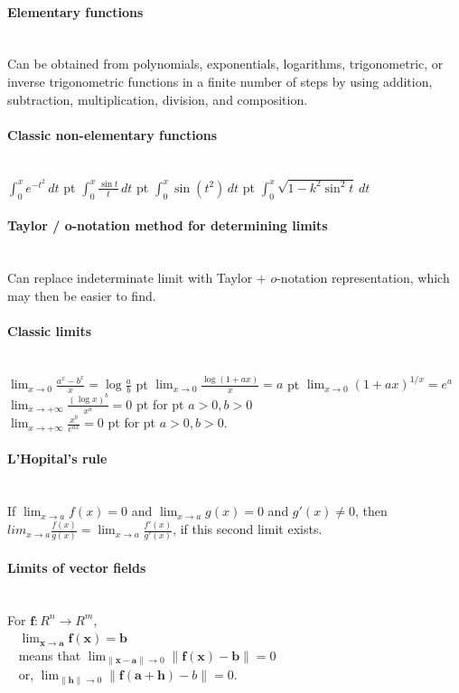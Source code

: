 \documentclass[10pt]{article}
\newcommand{\bs}[1]{\pmb{#1}}
\begin{document}
\paragraph{Elementary functions}\ \\
Can be obtained from polynomials, exponentials, logarithms, trigonometric, or inverse trigonometric
functions in a finite number of steps by using addition, subtraction, multiplication, division,
and composition.

\paragraph{Classic non-elementary functions}\ \\
$\int_0^xe^{-t^2}\,dt$  pt $\int_0^x\frac{\sin t}{t}\,dt$  pt 
$\int_0^x\sin(t^2)\,dt$  pt $\int_0^x\sqrt{1-k^2\sin^2t}\,dt$

\paragraph{Taylor / o-notation method for determining limits}\ \\
Can replace indeterminate limit with Taylor + $o$-notation representation, which may then be easier to find.

\paragraph{Classic limits}\ \\
$\lim_{x \to 0} \frac{a^x-b^x}{x} = \log \frac{a}{b}$  pt
$\lim_{x \to 0} \frac{\log(1+ax)}{x}= a$  pt
$\lim_{x\to 0} (1+ax)^{1/x}=e^a$\\
$\lim_{x\to +\infty}\frac{(\log x)^b}{x^a}=0$  pt for  pt $a>0,b>0$\\
$\lim_{x\to +\infty}\frac{x^b}{e^{ax}}=0$  pt for  pt $a>0,b>0$.

\paragraph{L'Hopital's rule}\ \\
If $\lim_{x\to a}f(x)=0$ and $\lim_{x\to a}g(x)=0$ and $g'(x)\neq 0$, then
$lim_{x\to a}\frac{f(x)}{g(x)}=\lim_{x\to a}\frac{f'(x)}{g'(x)}$, if this second limit exists.

\paragraph{Limits of vector fields}\ \\
For $\bs{f}:R^n \to R^m$,\\
$\phantom{x}$ $\lim_{\bs{x}\to \bs{a}} \bs{f}(\bs{x}) = \bs{b}$\\
$\phantom{x}$ means that $\lim_{\lVert \bs{x}-\bs{a} \rVert\to 0} \lVert\bs{f}(\bs{x})-\bs{b}\rVert = 0$\\
$\phantom{x}$ or, $\lim_{\lVert \bs{h}\rVert\to 0} \lVert\bs{f}(\bs{a}+\bs{h})-b\rVert = 0$.
\end{document}
